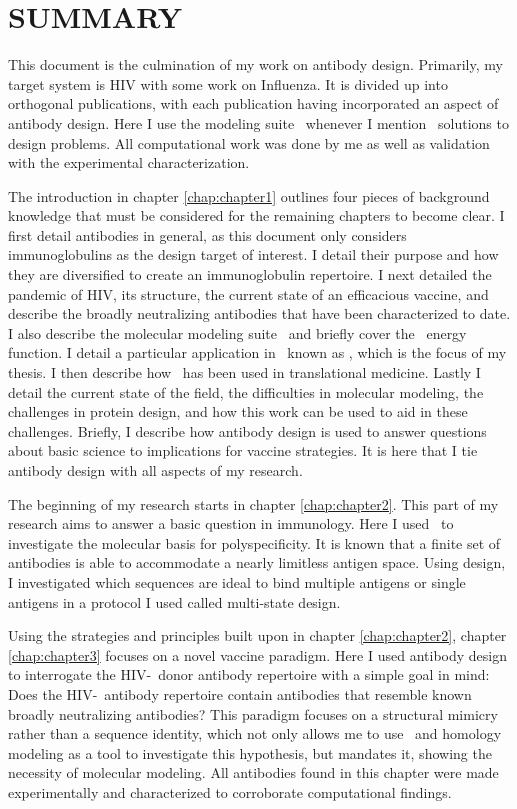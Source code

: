 \chapter*{SUMMARY}
\vspace{7mm}
This document is the culmination of my work on antibody design. Primarily, my target system is HIV with some work on Influenza. It is divided up into orthogonal publications, with each publication having incorporated an aspect of antibody design. Here I use the modeling suite \rosetta~whenever I mention \silico~solutions to design problems. All computational work was done by me as well as validation with the experimental characterization.

The introduction in chapter \ref{chap:chapter1} outlines four pieces of background knowledge that must be considered for the remaining chapters to become clear. I first detail antibodies in general, as this document only considers immunoglobulins as the design target of interest. I detail their purpose and how they are diversified to create an immunoglobulin repertoire. I next detailed the pandemic of HIV, its structure, the current state of an efficacious vaccine, and describe the broadly neutralizing antibodies that have been characterized to date. I also describe the molecular modeling suite \rosetta~and briefly cover the \rosetta~energy function. I detail a particular application in \rosetta~known as \rosettadesign, which is the focus of my thesis. I then describe how \rosettadesign~has been used in translational medicine. Lastly I detail the current state of the field, the difficulties in molecular modeling, the challenges in protein design, and how this work can be used to aid in these challenges. Briefly, I describe how antibody design is used to answer questions about basic science to implications for vaccine strategies. It is here that I tie antibody design with all aspects of my research.

The beginning of my research starts in chapter \ref{chap:chapter2}. This part of my research aims to answer a basic question in immunology. Here I used \rosettadesign~to investigate the molecular basis for polyspecificity. It is known that a finite set of antibodies is able to accommodate a nearly limitless antigen space. Using design, I investigated which sequences are ideal to bind multiple antigens or single antigens in a protocol I used called multi-state design.

Using the strategies and principles built upon in chapter \ref{chap:chapter2}, chapter \ref{chap:chapter3} focuses on a novel vaccine paradigm. Here I used antibody design to interrogate the HIV-\naive~donor antibody repertoire with a simple goal in mind: Does the HIV-\naive~antibody repertoire contain antibodies that resemble known broadly neutralizing antibodies? This paradigm focuses on a structural mimicry rather than a sequence identity, which not only allows me to use \rosettadesign~and homology modeling as a tool to investigate this hypothesis, but mandates it, showing the necessity of molecular modeling. All antibodies found in this chapter were made experimentally and characterized to corroborate computational findings.

